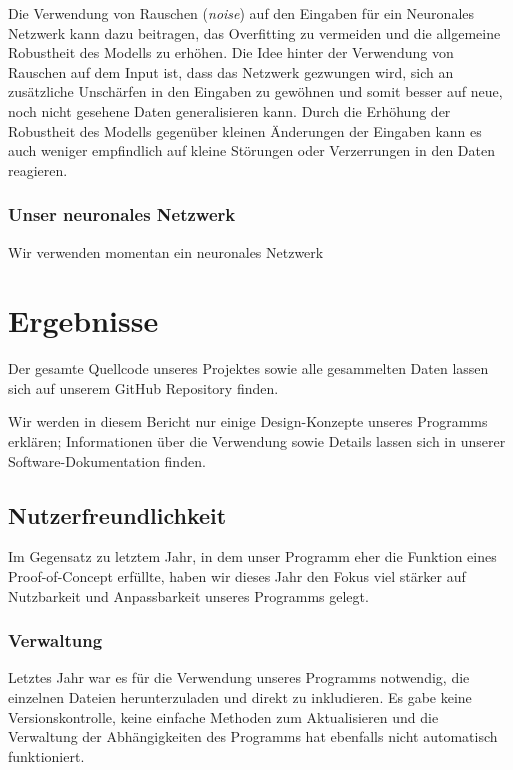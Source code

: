 \documentclass[10pt]{article}
\newcommand{\eng}[1]{\textit{#1}}
\begin{document}
Die Verwendung von Rauschen (\eng{noise}) auf den Eingaben für ein Neuronales Netzwerk kann dazu beitragen, das Overfitting zu vermeiden und die allgemeine Robustheit des Modells zu erhöhen.
Die Idee hinter der Verwendung von Rauschen auf dem Input ist, dass das Netzwerk gezwungen wird, sich an zusätzliche Unschärfen in den Eingaben zu gewöhnen und somit besser auf neue, noch nicht gesehene Daten generalisieren kann. Durch die Erhöhung der Robustheit des Modells gegenüber kleinen Änderungen der Eingaben kann es auch weniger empfindlich auf kleine Störungen oder Verzerrungen in den Daten reagieren.

\subsubsection{Unser neuronales Netzwerk}

Wir verwenden momentan ein neuronales Netzwerk

\section{Ergebnisse}

Der gesamte Quellcode unseres Projektes sowie alle gesammelten Daten lassen sich auf unserem GitHub Repository \cite{InterpretingEEG} finden.

Wir werden in diesem Bericht nur einige Design-Konzepte unseres Programms erklären; Informationen über die Verwendung sowie Details lassen sich in unserer Software-Dokumentation \cite{BCIInterfaceDocs} finden. 

\subsection{Nutzerfreundlichkeit}

Im Gegensatz zu letztem Jahr, in dem unser Programm eher die Funktion eines Proof-of-Concept erfüllte, haben wir dieses Jahr den Fokus viel stärker auf Nutzbarkeit und Anpassbarkeit unseres Programms gelegt.

\subsubsection{Verwaltung}

Letztes Jahr war es für die Verwendung unseres Programms notwendig, die einzelnen Dateien herunterzuladen und direkt zu inkludieren.
Es gabe keine Versionskontrolle, keine einfache Methoden zum Aktualisieren und die Verwaltung der Abhängigkeiten des Programms hat ebenfalls nicht automatisch funktioniert.
\end{document}
